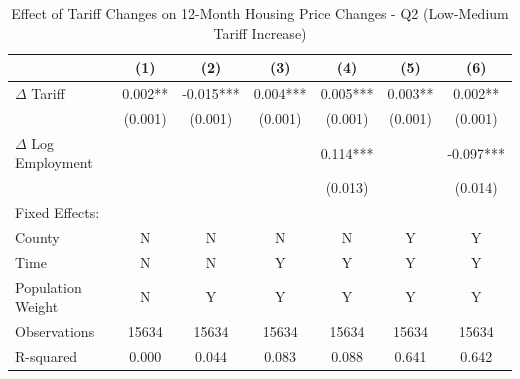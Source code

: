 \begin{table}[htbp]
\centering
\caption{Effect of Tariff Changes on 12-Month Housing Price Changes - Q2 (Low-Medium Tariff Increase)}
\label{tab:tariffs_changes_q2}
\begin{tabular}{lcccccc}
\toprule
{} &       (1) &      (2) &       (3) &       (4) &       (5) &        (6) \\
\midrule
$\Delta$ Tariff  &    0.002** & -0.015*** &  0.004*** &  0.005*** &   0.003** &    0.002** \\
                 &    (0.001) &   (0.001) &   (0.001) &   (0.001) &   (0.001) &    (0.001) \\
$\Delta$ Log Employment &           &           &           &  0.114*** &           &  -0.097*** \\
                 &           &           &           &   (0.013) &           &    (0.014) \\
Fixed Effects:   &           &          &           &           &           &            \\
County           &         N &        N &         N &         N &         Y &          Y \\
Time             &         N &        N &         Y &         Y &         Y &          Y \\
Population Weight &        N &        Y &         Y &         Y &         Y &          Y \\
\midrule
Observations     &     15634 &     15634 &     15634 &     15634 &     15634 &      15634 \\
R-squared        &     0.000 &     0.044 &     0.083 &     0.088 &     0.641 &      0.642 \\
\bottomrule
\end{tabular}
\end{table}
